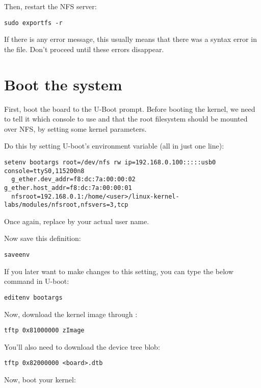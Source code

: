 Then, restart the NFS server:

\begin{verbatim}
sudo exportfs -r
\end{verbatim}

If there is any error message, this usually means that there was a
syntax error in the  file. Don't proceed until these
errors disappear.

\section{Boot the system}

First, boot the board to the U-Boot prompt. Before booting the kernel,
we need to tell it which console to use and that the root filesystem
should be mounted over NFS, by setting some kernel parameters.

Do this by setting U-boot's  environment variable (all in
just one line):

\begin{verbatim}
setenv bootargs root=/dev/nfs rw ip=192.168.0.100:::::usb0 console=ttyS0,115200n8
  g_ether.dev_addr=f8:dc:7a:00:00:02 g_ether.host_addr=f8:dc:7a:00:00:01
  nfsroot=192.168.0.1:/home/<user>/linux-kernel-labs/modules/nfsroot,nfsvers=3,tcp
\end{verbatim}

Once again, replace  by your actual user name.

Now save this definition:
\begin{verbatim}
saveenv
\end{verbatim}

If you later want to make changes to this setting, you can type the
below command in U-boot:

\begin{verbatim}
editenv bootargs
\end{verbatim}

Now, download the kernel image through :

\begin{verbatim}
tftp 0x81000000 zImage
\end{verbatim}

You'll also need to download the device tree blob:

\begin{verbatim}
tftp 0x82000000 <board>.dtb
\end{verbatim}

Now, boot your kernel:

